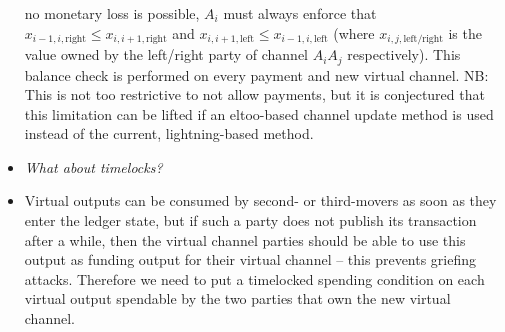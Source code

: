 \begin{itemize}
  no monetary loss is possible, $A_i$ must always enforce that $x_{i-1, i,
  \mathrm{right}} \leq x_{i, i+1, \mathrm{right}}$ and $x_{i, i+1,
  \mathrm{left}} \leq x_{i-1, i, \mathrm{left}}$ (where $x_{i, j,
  \mathrm{left/right}}$ is the value owned by the left/right party of channel
  $A_i A_j$ respectively). This balance check is performed on every payment and
  new virtual channel. NB: This is not too restrictive to not allow payments,
  but it is conjectured that this limitation can be lifted if an eltoo-based
  channel update method is used instead of the current, lightning-based method.
  \item \emph{What about timelocks?}
  \item Virtual outputs can be consumed by second- or third-movers as
  soon as they enter the ledger state, but if such a party does not publish its
  transaction after a while, then the virtual channel parties should be able to
  use this output as funding output for their virtual channel -- this prevents
  griefing attacks. Therefore we need to put a timelocked spending condition on
  each virtual output spendable by the two parties that own the new virtual
  channel.


\end{itemize}
